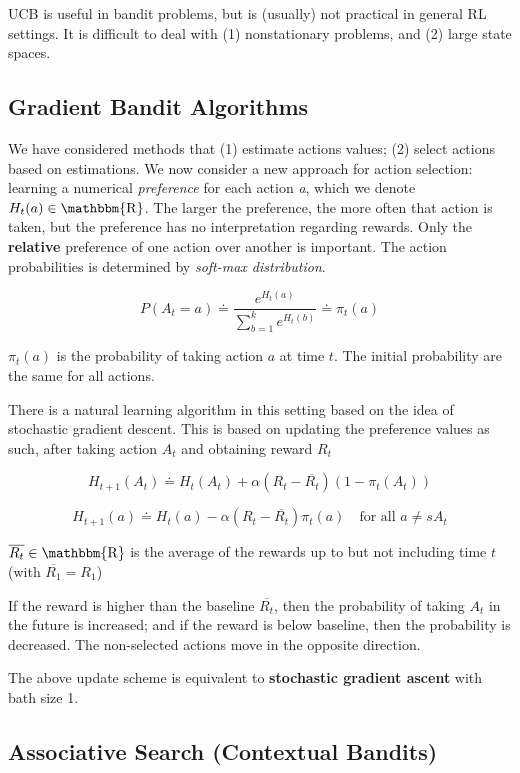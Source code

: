 \documentclass[lang=en,mode=geye,device=normal,color=blue,14pt]{elegantnote}
\DeclareMathOperator*{\1}{\mathbbm{1}}
\DeclareMathOperator*{\R}{\mathbbm{R}}
\begin{document}
UCB is useful in bandit problems, but is (usually) not practical in general RL settings. It is difficult to deal with (1) nonstationary problems, and (2) large state spaces.

\subsection{Gradient Bandit Algorithms}
We have considered methods that (1) estimate actions values; (2) select actions based on estimations.
We now consider a new approach for action selection: learning a numerical \textit{preference} for each action \textit{a}, which we denote $H_t(a) \in \R$.
The larger the preference, the more often that action is taken, but the preference has no interpretation regarding rewards.
Only the \textbf{relative} preference of one action over another is important.
The action probabilities is determined by \textit{soft-max distribution}.

\[
P(A_t=a) \doteq \frac{e^{H_t(a)}}{\sum_{b=1}^k e^{H_t(b)}} \doteq \pi_t(a)
\]

$\pi_t(a)$ is the probability of taking action $a$ at time $t$. The initial probability are the same for all actions.

There is a natural learning algorithm in this setting based on the idea of stochastic gradient descent.
This is based on updating the preference values as such, after taking action $A_t$ and obtaining reward $R_t$

$$ H_{t+1}(A_t)\doteq H_t(A_t) + \alpha (R_t - \overline{R_t})(1-\pi_t(A_t)) $$

$$ H_{t+1}(a) \doteq H_t(a) - \alpha(R_t - \overline{R_t})\pi_t(a)\quad\text{for all }a\neq sA_t $$

$\overline{R_t} \in \R $ is the average of the rewards up to but not including time $t$ (with $\overline{R_1} = R_1$)

If the reward is higher than the baseline $\overline{R_t}$, then the probability of taking $A_t$ in the future is increased; and if the reward is below baseline, then the probability is decreased.
The non-selected actions move in the opposite direction.

The above update scheme is equivalent to \textbf{stochastic gradient ascent} with bath size 1.

\subsection{Associative Search (Contextual Bandits)}
\end{document}
